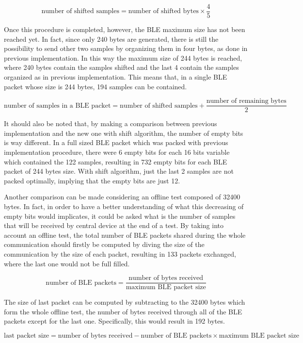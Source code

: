 \documentclass{Configuration_Files/PoliMi3i_thesis}
\begin{document}
\[
\text{number of shifted samples} = \text{number of shifted bytes} \times \frac{4}{5}
\]

Once this procedure is completed, however, the BLE maximum size has not been reached yet. In fact, since only 240 bytes are generated, there is still the possibility to send other two samples by organizing them in four bytes, as done in previous implementation. In this way the maximum size of 244 bytes is reached, where 240 bytes contain the samples shifted and the last 4 contain the samples organized as in previous implementation. This means that, in a single BLE packet whose size is 244 bytes, 194 samples can be contained.

\[
\text{number of samples in a BLE packet} = \text{number of shifted samples} + \frac{\text{number of remaining bytes}}{2}
\]

It should also be noted that, by making a comparison between previous implementation and the new one with shift algorithm, the number of empty bits is way different. In a full sized BLE packet which was packed with previous implementation procedure, there were 6 empty bits for each 16 bits variable which contained the 122 samples, resulting in 732 empty bits for each BLE packet of 244 bytes size. With shift algorithm, just the last 2 samples are not packed optimally, implying that the empty bits are just 12.

Another comparison can be made considering an offline test composed of 32400 bytes. In fact, in order to have a better understanding of what this decreasing of empty bits would implicates, it could be asked what is the number of samples that will be received by central device at the end of a test. By taking into account an offline test, the total number of BLE packets shared during the whole communication should firstly be computed by diving the size of the communication by the size of each packet, resulting in 133 packets exchanged, where the last one would not be full filled.

\[
\text{number of BLE packets} = \frac{\text{number of bytes received}}{\text{maximum BLE packet size}} \tag{Equation 1}
\]

The size of last packet can be computed by subtracting to the 32400 bytes which form the whole offline test, the number of bytes received through all of the BLE packets except for the last one. Specifically, this would result in 192 bytes.

\[
\text{last packet size} = \text{number of bytes received} - \text{number of BLE packets} \times \text{maximum BLE packet size}
\]
\end{document}
